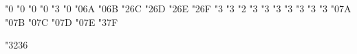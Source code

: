 \mathchardef \Finv   "0
\mathchardef \Game   "0
\mathchardef \mho   "0
\mathchardef \eth   "0
\mathchardef \eqsim   "3
\mathchardef \beth   "0
\mathchardef \gimel   "0\amsbfam 6A
\mathchardef \daleth   "0\amsbfam 6B
\mathchardef \lessdot   "2\amsbfam 6C
\mathchardef \gtrdot   "2\amsbfam 6D
\mathchardef \ltimes   "2\amsbfam 6E
\mathchardef \rtimes   "2\amsbfam 6F
\mathchardef \shortmid   "3
\mathchardef \shortparallel   "3
\mathchardef \smallsetminus   "2
\mathchardef \thicksim   "3
\mathchardef \thickapprox   "3
\mathchardef \approxeq   "3
\mathchardef \precapprox   "3
\mathchardef \succapprox   "3
\mathchardef \curvearrowleft   "3
\mathchardef \curvearrowright   "3
\mathchardef \digamma   "0\amsbfam 7A
\mathchardef \varkappa   "0\amsbfam 7B
\mathchardef \Bbbk   "0\amsbfam 7C
\mathchardef \hslash   "0\amsbfam 7D
\mathchardef \hbar   "0\amsbfam 7E
\mathchardef \backepsilon   "3\amsbfam 7F


\def\joinrel{\mathrel{\mkern-2.5mu}}  %

\let\circledplus\oplus
\let\circledminus\ominus
\let\circledtimes\otimes
\let\circledslash\oslash
\let\circleddot\odot


\def\scalebig#1#2{{\left#1\vbox to#2\fontdimen6\textfont3{}%
                   \kern-\nulldelimiterspace\right.}}
\def\big#1{\scalebig{#1}{.85}}  
\def\Big#1{\scalebig{#1}{1.15}} 
\def\bigg#1{\scalebig{#1}{1.45}}
\def\Bigg#1{\scalebig{#1}{1.75}}


\mathchardef \notchar  "3236

\def\not#1{%
  \ifx\TeX\relax \noexpand\not \else %
  \ifx #1<\nless \else
  \ifx #1>\ngtr \else
  \begingroup\escapechar=-1\xdef\tmpn{\string#1}\endgroup
  \expandafter\ifx \csname not\tmpn\endcsname \relax
     \expandafter\ifx \csname n\tmpn\endcsname \relax
         \mathrel{\mathord{\notchar}\mathord{#1}}%
     \else \csname n\tmpn\endcsname \fi
  \else \csname not\tmpn\endcsname \fi
  \fi\fi\fi}

